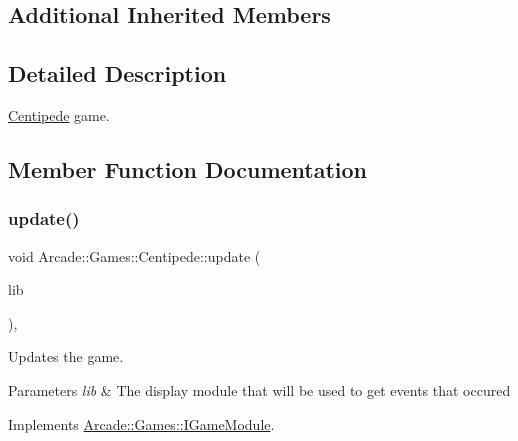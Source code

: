 \subsection*{Additional Inherited Members}


\subsection{Detailed Description}
\mbox{\hyperlink{classArcade_1_1Games_1_1Centipede}{Centipede}} game. 

\subsection{Member Function Documentation}
\mbox{\label{classArcade_1_1Games_1_1Centipede_a11a932a0abda301ae6037c6b97532e79}} 
\subsubsection{\texorpdfstring{update()}{update()}}
{\footnotesize\ttfamily void Arcade\+::\+Games\+::\+Centipede\+::update (\begin{DoxyParamCaption}\item[{const \mbox{\hyperlink{classArcade_1_1Display_1_1IDisplayModule}{Arcade\+::\+Display\+::\+I\+Display\+Module}} \&}]{lib }\end{DoxyParamCaption})\hspace{0.3cm}{\ttfamily [final]}, {\ttfamily [virtual]}}



Updates the game. 


\begin{DoxyParams}{Parameters}
{\em lib} & The display module that will be used to get events that occured \\
\hline
\end{DoxyParams}


Implements \mbox{\hyperlink{classArcade_1_1Games_1_1IGameModule_a421d1064fcc112dfc7ea025fc7f88aa7}{Arcade\+::\+Games\+::\+I\+Game\+Module}}.


